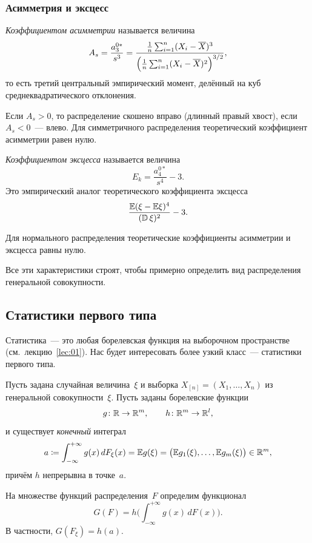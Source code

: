 \subsubsection{Асимметрия и эксцесс}

\begin{definition}
  \emph{Коэффициентом асимметрии} называется величина
  \[
    A_s = \frac{a_3^{0*}}{s^3}
        = \frac{\frac{1}{n} \sum_{i=1}^n (X_i - \overline{X})^3}
               {\Bigl(\frac{1}{n} \sum_{i=1}^n (X_i - \overline{X})^2\Bigr)^{3/2}},
  \]
  то есть третий центральный эмпирический момент, делённый на куб
  среднеквадратического отклонения.
\end{definition}

Если $A_s > 0$, то распределение скошено вправо (длинный правый хвост),
если $A_s < 0$~--- влево. Для симметричного распределения теоретический
коэффициент асимметрии равен нулю.

\begin{definition}
  \emph{Коэффициентом эксцесса} называется величина
  \[
    E_k = \frac{a_4^{0*}}{s^4} - 3.
  \]
  Это эмпирический аналог теоретического коэффициента эксцесса
  \[
    \frac{\mathbb{E} (\xi - \mathbb{E}\xi)^4}{(\operatorname{\mathbb{D}}\xi)^2} - 3.
  \]
\end{definition}

Для нормального распределения теоретические коэффициенты асимметрии
и эксцесса равны нулю.

\medskip

Все эти характеристики строят, чтобы примерно определить вид распределения
генеральной совокупности.

\subsection{Статистики первого типа}
\label{lec03:first-type}

Статистика~--- это любая борелевская функция на выборочном пространстве
(см.~лекцию~\ref{lec:01}). Нас будет интересовать более узкий класс~--- статистики первого типа.

Пусть задана случайная величина~$\xi$ и выборка $X_{[n]} = (X_1, \ldots, X_n)$
из генеральной совокупности~$\xi$. Пусть заданы борелевские функции
\[
  g \colon \mathbb{R} \to \mathbb{R}^m, \qquad h \colon \mathbb{R}^m \to \mathbb{R}^l,
\]
и существует \emph{конечный} интеграл
\[
  a \coloneqq \int_{-\infty}^{+\infty} g(x)\, dF_\xi(x) = \mathbb{E} g(\xi)
  = \bigl(\mathbb{E} g_1(\xi), \ldots, \mathbb{E} g_m(\xi)\bigr) \in \mathbb{R}^m,
\]
причём $h$ непрерывна в точке~$a$.

На множестве функций распределения~$F$ определим функционал
\[
  G(F) = h\biggl(\int_{-\infty}^{+\infty} g(x)\, dF(x)\biggr).
\]
В частности, $G(F_\xi) = h(a)$.

